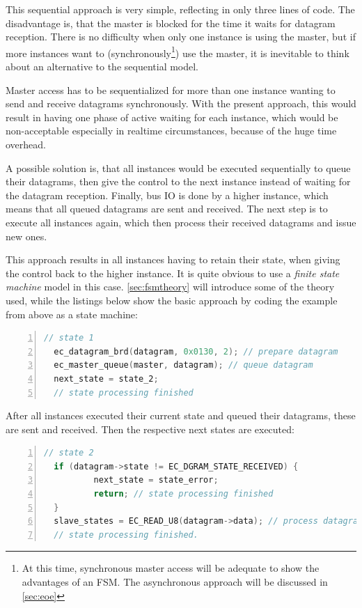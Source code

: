 \documentclass[a4paper,12pt,BCOR6mm,bibtotoc,idxtotoc]{scrbook}
\begin{document}
This sequential approach is very simple, reflecting in only three lines of
code. The disadvantage is, that the master is blocked for the time it waits
for datagram reception. There is no difficulty when only one instance is using
the master, but if more instances want to (synchronously\footnote{At this
time, synchronous master access will be adequate to show the advantages of an
FSM. The asynchronous approach will be discussed in \autoref{sec:eoe}}) use
the master, it is inevitable to think about an alternative to the sequential
model.

Master access has to be sequentialized for more than one instance
wanting to send and receive datagrams synchronously. With the present
approach, this would result in having one phase of active waiting for
each instance, which would be non-acceptable especially in realtime
circumstances, because of the huge time overhead.

A possible solution is, that all instances would be executed
sequentially to queue their datagrams, then give the control to the
next instance instead of waiting for the datagram reception. Finally,
bus IO is done by a higher instance, which means that all queued
datagrams are sent and received. The next step is to execute all
instances again, which then process their received datagrams and issue
new ones.

This approach results in all instances having to retain their state,
when giving the control back to the higher instance. It is quite
obvious to use a \textit{finite state machine} model in this case.
\autoref{sec:fsmtheory} will introduce some of the theory used,
while the listings below show the basic approach by coding the example
from above as a state machine:

\begin{lstlisting}[gobble=2,language=C,numbers=left]
  // state 1
  ec_datagram_brd(datagram, 0x0130, 2); // prepare datagram
  ec_master_queue(master, datagram); // queue datagram
  next_state = state_2;
  // state processing finished
\end{lstlisting}

After all instances executed their current state and queued their
datagrams, these are sent and received. Then the respective next
states are executed:

\begin{lstlisting}[gobble=2,language=C,numbers=left]
  // state 2
  if (datagram->state != EC_DGRAM_STATE_RECEIVED) {
          next_state = state_error;
          return; // state processing finished
  }
  slave_states = EC_READ_U8(datagram->data); // process datagram
  // state processing finished.
\end{lstlisting}
\end{document}
